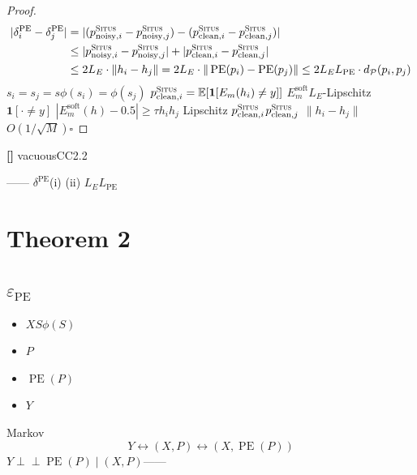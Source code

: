 \documentclass[11pt,a4paper]{article}
\theoremstyle{remark}
\DeclareMathOperator{\PE}{PE}
\newcommand{\Ppos}{\mathcal{P}}
\newcommand{\E}{\mathbb{E}}
\newcommand{\indep}{\perp\!\!\!\perp}
\newcommand{\Situs}{\textsc{Situs}}
\newcommand{\rigorous}{\textnormal{\textbf{[]}}}
\begin{document}
\begin{proof}
\begin{align}
    |\delta_i^{\PE} - \delta_j^{\PE}|
    &= |(p_{\text{noisy}, i}^{\Situs} - p_{\text{noisy}, j}^{\Situs})
       - (p_{\text{clean}, i}^{\Situs} - p_{\text{clean}, j}^{\Situs})| \nonumber\\
    &\leq |p_{\text{noisy}, i}^{\Situs} - p_{\text{noisy}, j}^{\Situs}|
       + |p_{\text{clean}, i}^{\Situs} - p_{\text{clean}, j}^{\Situs}| \nonumber\\
    &\leq 2L_E \cdot \|h_i - h_j\|
     = 2L_E \cdot \|\PE(p_i) - \PE(p_j)\|
     \leq 2L_E L_{\PE} \cdot d_{\Ppos}(p_i, p_j)
\end{align}
$s_i = s_j = s$$\phi(s_i) = \phi(s_j)$
\textbf{}$p_{\text{clean},i}^{\Situs}
= \E[\mathbf{1}[E_m(h_i) \neq y]]$\textbf{}
$E_m^{\text{soft}}$$L_E$-Lipschitz$\mathbf{1}[\cdot \neq y]$
$|E_m^{\text{soft}}(h) - 0.5| \geq \tau$$h_i$$h_j$
Lipschitz
$p_{\text{clean},i}^{\Situs}$$p_{\text{clean},j}^{\Situs}$
$\|h_i - h_j\|$
$O(1/\sqrt{M})$\hfill $\square$
\end{proof}

\rigorous{} \textbf{}
vacuousCC2.2


\textbf{}\textbf{}——
\textbf{}
$\delta^{\PE}$(i) 
 (ii) $L_E L_{\PE}$

\section{Theorem 2}

\subsection{$\varepsilon_{\PE}$}


\begin{itemize}
    \item $X$$S$$\phi(S)$
    \item $P$
    \item $\PE(P)$
    \item $Y$
\end{itemize}
Markov
\begin{equation}
    Y \leftrightarrow (X, P) \leftrightarrow (X, \PE(P))
\end{equation}
$Y \indep \PE(P) \mid (X, P)$——
\end{document}
